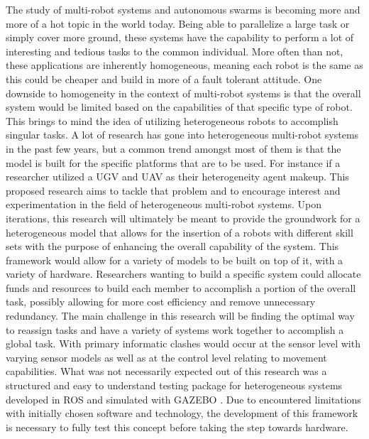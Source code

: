 The study of multi-robot systems and autonomous swarms is becoming more and more of a hot topic in
the world today. Being able to parallelize a large task or simply cover more ground, these systems
have the capability to perform a lot of interesting and tedious tasks to the common individual.
More often than not, these applications are inherently homogeneous, meaning each robot is the same
as this could be cheaper and build in more of a fault tolerant attitude. One downside to homogeneity
in the context of multi-robot systems is that the overall system would be limited based on the capabilities
of that specific type of robot. This brings to mind the idea of utilizing heterogeneous robots to accomplish
singular tasks. A lot of research has gone into
heterogeneous multi-robot systems in the past few years, but a common trend
amongst most of them is that the model is built for the specific platforms
that are to be used. For instance if a researcher utilized a UGV and UAV as their
heterogeneity agent makeup. This proposed research aims to tackle that problem and
to encourage interest and experimentation in the field of heterogeneous multi-robot systems.
Upon iterations, this research will ultimately be meant to provide the groundwork
for a heterogeneous model that allows for the insertion of a robots with different
skill sets with the purpose of enhancing the overall capability of the system.
This framework would allow for a variety of models to be built on top of it,
with a variety of hardware. Researchers wanting to build a specific system
could allocate funds and resources to build each member to accomplish a portion
of the overall task, possibly allowing for more cost efficiency and remove
unnecessary redundancy. The main challenge in this research will be finding
the optimal way to reassign tasks and have a variety of systems work together to accomplish
a global task. With primary informatic clashes would occur at the sensor level with varying sensor models as
well as at the control level relating to movement capabilities. What was not necessarily
expected out of this research was a structured and
easy to understand testing package for heterogeneous systems developed in ROS and simulated with GAZEBO \cite{ROS} .
Due to encountered limitations with initially chosen software and technology, the development
of this framework is necessary to fully test this concept before taking the step towards hardware.
